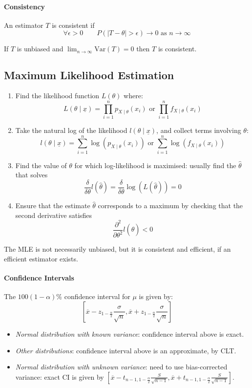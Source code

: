 \documentclass[twocolumn,english]{article}
\begin{document}
\paragraph{Consistency}

An estimator $T$ is consistent if
\[
\forall\epsilon>0\qquad P\left(\left|T-\theta\right|>\epsilon\right)\rightarrow0\text{ as }n\rightarrow\infty
\]

If $T$ is unbiased and $\lim_{n\rightarrow\infty}\text{Var}\left(T\right)=0$
then $T$ is consistent.

\subsection{Maximum Likelihood Estimation}
\begin{enumerate}
\item Find the likelihood function $L\left(\theta\right)$ where:
\[
L\left(\theta\mid\underline{x}\right)=\prod_{i=1}^{n}p_{X\mid\theta}\left(x_{i}\right)\text{ or }\prod_{i=1}^{n}f_{X\mid\theta}\left(x_{i}\right)
\]
\item Take the natural log of the likelihood $l\left(\theta\mid\underline{x}\right)$,
and collect terms involving $\theta$:
\[
l\left(\theta\mid\underline{x}\right)=\sum_{i=1}^{n}\log\left(p_{X\mid\theta}\left(x_{i}\right)\right)\text{ or }\sum_{i=1}^{n}\log\left(f_{X\mid\theta}\left(x_{i}\right)\right)
\]
\item Find the value of $\theta$ for which log-likelihood is maximised:
usually find the $\hat{\theta}$ that solves
\[
\frac{\delta}{\delta\theta}l\left(\hat{\theta}\right)=\frac{\delta}{\delta\theta}\log\left(L\left(\hat{\theta}\right)\right)=0
\]
\item Ensure that the estimate $\hat{\theta}$ corresponds to a maximum
by checking that the second derivative satisfies
\[
\frac{\partial^{2}}{\partial\theta^{2}}l\left(\hat{\theta}\right)<0
\]
\end{enumerate}
The MLE is not necessarily unbiased, but it is consistent and efficient,
if an efficient estimator exists.

\paragraph{Confidence Intervals}

The $100\left(1-\alpha\right)\%$ confidence interval for $\mu$ is
given by:
\[
\left[\overline{x}-z_{1-\frac{\alpha}{2}}\frac{\sigma}{\sqrt{n}},\overline{x}+z_{1-\frac{\alpha}{2}}\frac{\sigma}{\sqrt{n}}\right]
\]
\begin{itemize}
\item \emph{Normal distribution with known variance}: confidence interval
above is exact.
\item \emph{Other distributions}: confidence interval above is an approximate,
by CLT.
\item \emph{Normal distribution with unknown variance}: need to use bias-corrected
variance: exact CI is given by $\left[\overline{x}-t_{n-1,1-\frac{\alpha}{2}}\frac{S}{\sqrt{n-1}},\overline{x}+t_{n-1,1-\frac{\alpha}{2}}\frac{S}{\sqrt{n-1}}\right]$.
\end{itemize}
\end{document}
